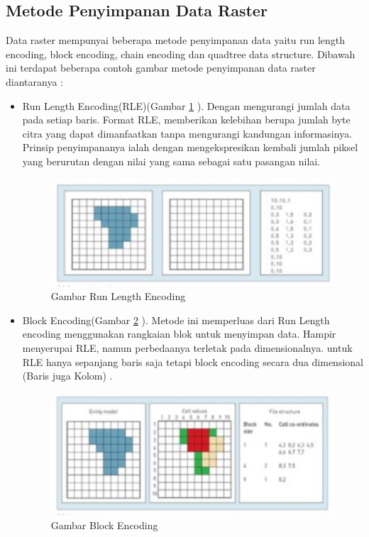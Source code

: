 \subsection{Metode Penyimpanan Data Raster}
Data raster mempunyai beberapa metode penyimpanan data yaitu run length encoding, block encoding, chain encoding dan quadtree data structure. Dibawah ini terdapat beberapa contoh gambar metode penyimpanan data raster diantaranya :
	\begin{itemize}
		\item  Run Length Encoding(RLE)(Gambar \ref{runlengthencoding} ). Dengan mengurangi jumlah data pada setiap baris. Format RLE, memberikan kelebihan berupa jumlah byte citra yang dapat dimanfaatkan tanpa mengurangi kandungan informasinya. Prinsip penyimpananya ialah dengan mengekspresikan kembali jumlah piksel yang berurutan dengan nilai yang sama sebagai satu pasangan nilai.
				\begin{figure} [ht]
					\centerline{\includegraphics[width=1\textwidth]{figures/runlengthencoding.JPG}}
					\caption{Gambar Run Length Encoding}
					\label{runlengthencoding}
				\end{figure}

		\item  Block Encoding(Gambar \ref{blockencoding} ). Metode ini memperluas dari Run Length encoding menggunakan rangkaian blok untuk menyimpan data. Hampir menyerupai RLE, namun perbedaanya terletak pada dimensionalnya. untuk RLE hanya sepanjang baris saja tetapi block encoding secara dua dimensional (Baris juga Kolom) .
				\begin{figure} [ht]
					\centerline{\includegraphics[width=1\textwidth]{figures/blockencoding.JPG}}
					\caption{Gambar Block Encoding}
					\label{blockencoding}
					

\end{figure}
\end{itemize}
